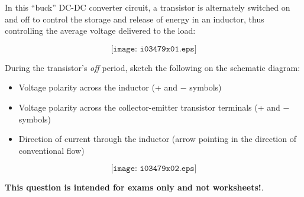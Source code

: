 

In this ``buck'' DC-DC converter circuit, a transistor is alternately switched on and off to control the storage and release of energy in an inductor, thus controlling the average voltage delivered to the load:

$$\texttt{[image: i03479x01.eps]}$$

During the transistor's {\it off} period, sketch the following on the schematic diagram:

\begin{itemize}
\item{} Voltage polarity across the inductor (+ and $-$ symbols)
\vskip 5pt
\item{} Voltage polarity across the collector-emitter transistor terminals (+ and $-$ symbols)
\vskip 5pt
\item{} Direction of current through the inductor (arrow pointing in the direction of conventional flow)
\end{itemize}







$$\texttt{[image: i03479x02.eps]}$$







{\bf This question is intended for exams only and not worksheets!}.


